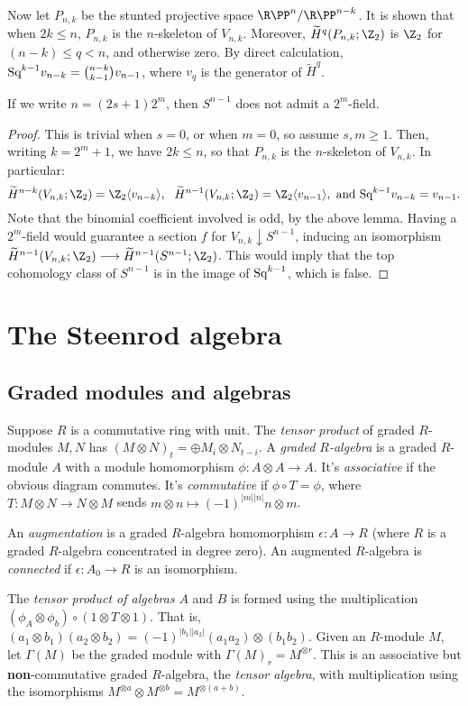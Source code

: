 \documentclass[11pt]{article}
\begin{document}
{Now let $P_{n,k}$ be the stunted projective space $\RP^n/\RP^{n-k}$. It is shown that when $2k\leq n$, $P_{n,k}$ is the $n$-skeleton of $V_{n,k}$. Moreover, $\widetilde H^q(P_{n,k};\Z_2)$ is $\Z_2$ for $(n-k)\leq q<n$, and otherwise zero. By direct calculation, $\textup{Sq}^{k-1}v_{n-k}=\binom{n-k}{k-1}v_{n-1}$, where $v_q$ is the generator of $\widetilde H^q$.
\begin{thm*}
If we write $n=(2s+1)2^m$, then $S^{n-1}$ does not admit a $2^m$-field.
\end{thm*}
\begin{proof}
This is trivial when $s=0$, or when $m=0$, so assume $s,m\geq1$. Then, writing $k=2^m+1$, we have $2k\leq n$, so that $P_{n,k}$ is the $n$-skeleton of $V_{n,k}$. In particular: \[\widetilde H^{n-k}(V_{n,k};\Z_2)=\Z_2\langle v_{n-k}\rangle,\ \ \widetilde H^{n-1}(V_{n,k};\Z_2)=\Z_2\langle v_{n-1}\rangle,\text{ and }\Squ^{k-1}v_{n-k}=v_{n-1}.\]
Note that the binomial coefficient involved is odd, by the above lemma.
Having a $2^m$-field would guarantee a section $f$ for $V_{n,k}\downarrow S^{n-1}$, inducing an  isomorphism $\widetilde H^{n-1}(V_{n,k};\Z_2)\to\widetilde H^{n-1}(S^{n-1};\Z_2)$. This would imply that the top cohomology class of $S^{n-1}$ is in the image of $\textup{Sq}^{k-1}$, which is false.
\end{proof}

\section{The Steenrod algebra}
\subsection{Graded modules and algebras}
Suppose $R$ is a commutative ring with unit. The \emph{tensor product} of graded $R$-modules $M,N$ has $(M\otimes N)_t=\oplus M_{i}\otimes N_{t-i}$. A \emph{graded $R$-algebra} is a graded $R$-module $A$ with a module homomorphism $\phi:A\otimes A\to A$. It's \emph{associative} if the obvious diagram commutes. It's \emph{commutative} if $\phi\circ T=\phi$, where $T:M\otimes N\to N\otimes M$ sends $m\otimes n\mapsto (-1)^{|m||n|}n\otimes m$.

An \emph{augmentation} is a graded $R$-algebra homomorphism $\epsilon:A\to R$ (where $R$ is a graded $R$-algebra concentrated in degree zero). An augmented $R$-algebra is \emph{connected} if $\epsilon:A_0\to R$ is an isomorphism.

The \emph{tensor product of algebras} $A$ and $B$ is formed using the multiplication $(\phi_A\otimes\phi_b)\circ(1\otimes T\otimes 1)$. That is, $(a_1\otimes b_1)(a_2\otimes b_2)=(-1)^{|b_1||a_2|}(a_1a_2)\otimes(b_1b_2)$. Given an $R$-module $M$, let $\Gamma(M)$ be the graded module with $\Gamma(M)_r=M^{\otimes r}$. This is an associative but \textbf{non}-commutative graded $R$-algebra, the \emph{tensor algebra}, with multiplication using the isomorphisms $M^{\otimes a}\otimes M^{\otimes b}=M^{\otimes (a+b)}$.

}
\end{document}
